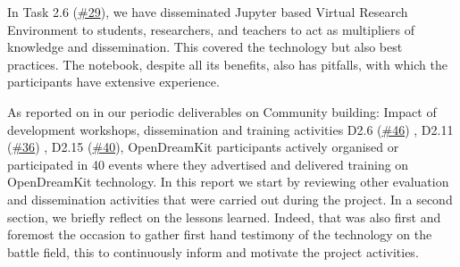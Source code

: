In Task 2.6
(\href{https://github.com/OpenDreamKit/OpenDreamKit/issues/29}{\#29}),
we have disseminated Jupyter based Virtual Research Environment to
students, researchers, and teachers to act as multipliers of knowledge
and dissemination. This covered the technology but also best practices.
The notebook, despite all its benefits, also has pitfalls, with which
the participants have extensive experience.

As reported on in our periodic deliverables on Community building:
Impact of development workshops, dissemination and training activities
D2.6
(\href{https://github.com/OpenDreamKit/OpenDreamKit/issues/46}{\#46}) ,
D2.11
(\href{https://github.com/OpenDreamKit/OpenDreamKit/issues/36}{\#36}) ,
D2.15
(\href{https://github.com/OpenDreamKit/OpenDreamKit/issues/40}{\#40}),
OpenDreamKit participants actively organised or participated in 40
events where they advertised and delivered training on OpenDreamKit
technology. In this report we start by reviewing other evaluation and
dissemination activities that were carried out during the project. In a
second section, we briefly reflect on the lessons learned. Indeed, that
was also first and foremost the occasion to gather first hand testimony
of the technology on the battle field, this to continuously inform and
motivate the project activities.
